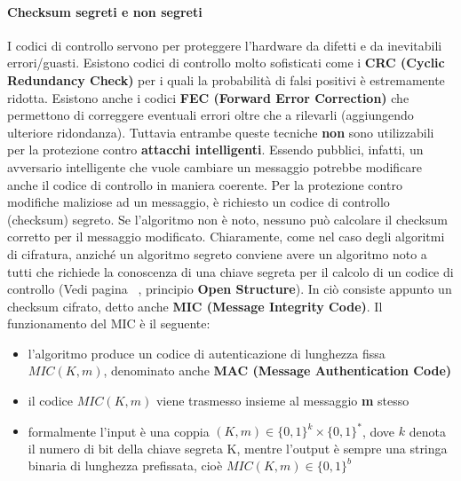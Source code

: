 \paragraph{Checksum segreti e non segreti}
I codici di controllo servono per proteggere l'hardware da difetti e da inevitabili errori/guasti. Esistono codici di controllo molto sofisticati come i \textbf{CRC (Cyclic Redundancy Check)} per i quali la probabilità di falsi positivi è estremamente ridotta. Esistono anche i codici \textbf{FEC (Forward Error Correction)} che permettono di correggere eventuali errori oltre che a rilevarli (aggiungendo ulteriore ridondanza). Tuttavia entrambe queste tecniche \textbf{non} sono utilizzabili per la protezione contro \textbf{attacchi intelligenti}. Essendo pubblici, infatti, un avversario intelligente che vuole cambiare un messaggio potrebbe modificare anche il codice di controllo in maniera coerente.\newline \newline
Per la protezione contro modifiche maliziose ad un messaggio, è richiesto un codice di controllo (checksum) segreto. Se l'algoritmo non è noto, nessuno può calcolare il checksum corretto per il messaggio modificato. Chiaramente, come nel caso degli algoritmi di cifratura, anziché un
algoritmo segreto conviene avere un algoritmo noto a tutti che richiede la conoscenza di una chiave segreta per il calcolo di un codice di controllo (Vedi pagina ~\pageref{sec:openStruct}, principio \textbf{Open Structure}). \newline \newline
In ciò consiste appunto un checksum cifrato, detto anche \textbf{MIC (Message Integrity Code)}. Il funzionamento del MIC è il seguente:
\begin{itemize}
  \item l'algoritmo produce un codice di autenticazione di lunghezza fissa $MIC(K,m)$, denominato anche \textbf{MAC (Message Authentication Code)}
  \item il codice $MIC(K,m)$ viene trasmesso insieme al messaggio \textbf{m} stesso
  \item formalmente l'input è una coppia $(K,m) \in \{0, 1\}^k \times \{0, 1\}^*$, dove $k$ denota il numero di bit della chiave segreta K, mentre l'output è sempre una stringa binaria di lunghezza prefissata, cioè $MIC(K,m) \in \{0, 1\}^b$
\end{itemize}

